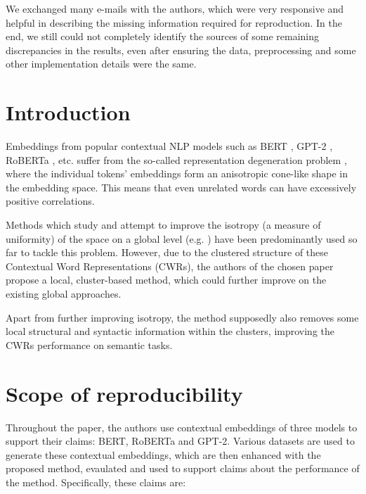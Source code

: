 We exchanged many e-mails with the authors, which were very responsive and helpful in describing the missing information required for reproduction. In the end, we still could not completely identify the sources of some remaining discrepancies in the results, even after ensuring the data, preprocessing and some other implementation details were the same.

\clearpage

\section{Introduction}

Embeddings from popular contextual NLP models such as BERT \cite{bert}, GPT-2 \cite{gpt2}, RoBERTa \cite{roberta}, etc. suffer from the so-called representation degeneration problem \cite{repdeg}, where the individual tokens' embeddings form an anisotropic cone-like shape in the embedding space. This means that even unrelated words can have excessively positive correlations.

Methods which study and attempt to improve the isotropy (a measure of uniformity) of the space on a global level (e.g. \cite{global}) have been predominantly used so far to tackle this problem. However, due to the clustered structure of these Contextual Word Representations (CWRs), the authors of the chosen paper \cite{local} propose a local, cluster-based method, which could further improve on the existing global approaches. 

Apart from further improving isotropy, the method supposedly also removes some local structural and syntactic information within the clusters, improving the CWRs performance on semantic tasks. 

\section{Scope of reproducibility}
\label{sec:claims}

Throughout the paper, the authors use contextual embeddings of three models to support their claims: BERT, RoBERTa and GPT-2. Various datasets are used to generate these contextual embeddings, which are then enhanced with the proposed method, evaulated and used to support claims about the performance of the method. Specifically, these claims are: 



